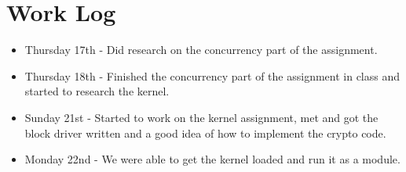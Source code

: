 \documentclass[letterpaper,10pt,titlepage, onecolumn, compsoc]{IEEEtran}
\begin{document}
\section{Work Log}
\begin{itemize}

\item Thursday 17th - Did research on the concurrency part of the assignment. 
\item Thursday 18th - Finished the concurrency part of the assignment in class and started to research the kernel. 
\item Sunday 21st - Started to work on the kernel assignment, met and got the block driver written and a good idea of how to implement the crypto code. 
\item Monday 22nd -  We were able to get the kernel loaded and run it as a module. 
\end{itemize}
\end{document}
